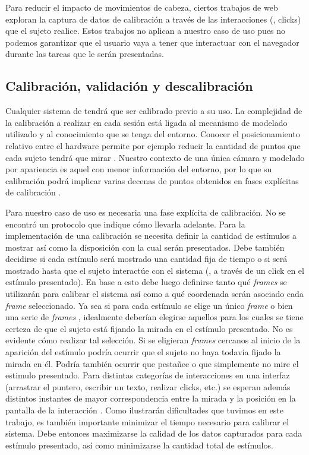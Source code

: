 Para reducir el impacto de movimientos de cabeza, ciertos trabajos de
\eyetracking web \cite{papoutsaki_2016_webgazer, huang_2016_pace} exploran la
captura de datos de calibración a través de las interacciones (\eg, clicks)
que el sujeto realice.
Estos trabajos no aplican a nuestro caso de uso pues no podemos garantizar que
el usuario vaya a tener que interactuar con el navegador durante las tareas que
le serán presentadas.

\subsection{Calibración, validación y descalibración}
\label{section:intro:calibration}

Cualquier sistema de \eyetracking tendrá que ser calibrado previo a su uso.
La complejidad de la calibración a realizar en cada sesión está ligada al
mecanismo de modelado utilizado y al conocimiento que se tenga del entorno.
Conocer el posicionamiento relativo entre el hardware permite por ejemplo
reducir la cantidad de puntos que cada sujeto tendrá que mirar
\cite{hansen_2009_eye_of_the_beholder}.
Nuestro contexto de una única cámara y modelado por apariencia es aquel con
menor información del entorno, por lo que su calibración podrá implicar varias
decenas de puntos obtenidos en fases explícitas de calibración
\cite{xu_2015_turker_gaze}.

Para nuestro caso de uso es necesaria una fase explícita de calibración.
No se encontró un protocolo que indique cómo llevarla adelante.
Para la implementación de una calibración se necesita definir la cantidad de
estímulos a mostrar así como la disposición con la cual serán presentados.
Debe también decidirse si cada estímulo será mostrado una cantidad fija de
tiempo o si será mostrado hasta que el sujeto interactúe con el sistema (\eg,
a través de un click en el estímulo presentado).
En base a esto debe luego definirse tanto qué \textit{frames} se utilizarán
para calibrar el sistema así como a qué coordenada serán asociado cada
\textit{frame} seleccionado.
Ya sea si para cada estímulo se elige un único \textit{frame}
\cite{papoutsaki_2016_webgazer} o bien una serie de \textit{frames}
\cite{xu_2015_turker_gaze}, idealmente deberían elegirse aquellos para los
cuales se tiene certeza de que el sujeto está fijando la mirada en el estímulo
presentado.
No es evidente cómo realizar tal selección.
Si se eligieran \textit{frames} cercanos al inicio de la aparición del
estímulo podría ocurrir que el sujeto no haya todavía fijado la mirada en él.
Podría también ocurrir que pestañee o que simplemente no mire el
estimulo presentado.
Para distintas categorías de interacciones en una interfaz (arrastrar el
puntero, escribir un texto, realizar clicks, etc.) se esperan además distintos
instantes de mayor correspondencia entre la mirada y la posición en la pantalla
de la interacción \cite{huang_2016_pace}.
Como ilustrarán dificultades que tuvimos en este trabajo, es también importante
minimizar el tiempo necesario para calibrar el sistema.
Debe entonces maximizarse la calidad de los datos capturados para cada estímulo
presentado, así como minimizarse la cantidad total de estímulos.

